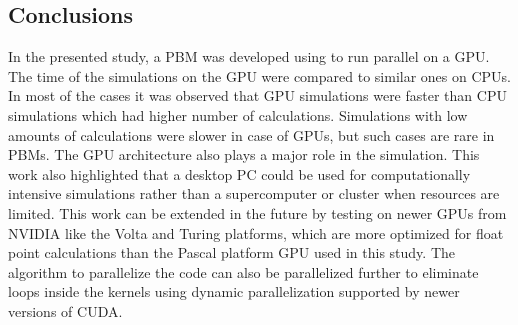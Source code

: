 \documentclass[preprint,10pt,authoryear,review]{elsarticle}
\begin{document}
\begin{linenumbers}
\section{Conclusions}
\label{secConc}
In the presented study, a PBM was developed using to run parallel on a GPU. The time 
of the simulations on the GPU were compared to similar ones on CPUs. In most of the 
cases it was observed that GPU simulations were faster than CPU simulations which had 
higher number of calculations. Simulations with low amounts of calculations were slower 
in case of GPUs, but such cases are rare in PBMs. The GPU architecture also plays a major 
role in the simulation. This work also highlighted that a desktop PC could be used for 
computationally intensive simulations rather than a supercomputer or cluster when resources 
are limited. This work can be extended in the future by testing on newer GPUs from NVIDIA 
like the Volta and Turing platforms, which are more optimized for float point calculations 
than the Pascal platform GPU used in this study. The algorithm to parallelize the code 
can also be parallelized further to eliminate loops inside the kernels using dynamic 
parallelization supported by newer versions of CUDA.

\end{linenumbers}



\end{document}
